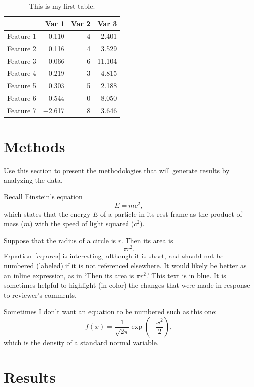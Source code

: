 \documentclass[12pt]{article}
\newcommand{\blue}{\color{blue}}
\begin{document}
\begin{table}[!t]
  \caption{This is my first table.}
	\label{tab:rv}
\centering
\begin{tabular}{lrrr}
  \toprule
& Var 1 & Var 2 & Var 3 \\ 
  \midrule
Feature 1 & $-$0.110 & 4 & 2.401 \\ 
Feature 2 &    0.116 & 4 & 3.529 \\ 
Feature 3 & $-$0.066 & 6 & 11.104 \\ 
Feature 4 &    0.219 & 3 & 4.815 \\ 
Feature 5 &    0.303 & 5 & 2.188 \\ 
Feature 6 &    0.544 & 0 & 8.050 \\ 
Feature 7 & $-$2.617 & 8 & 3.646 \\ 
  \bottomrule
\end{tabular}
\end{table}


\section{Methods}
\label{sec:meth}

Use this section to present the methodologies that will generate results by
analyzing the data. 

Recall Einstein's equation
\begin{equation}
  \label{eq:mc2}
  E = m c^2,
\end{equation}
which states that the energy $E$ of a particle in its rest frame as the product
of mass ($m$) with the speed of light squared ($c^2$).

Suppose that the radius of a circle is $r$. Then its area is
\begin{equation}
  \label{eq:area}
  \pi r^2.
\end{equation}
%
Equation~\eqref{eq:area} is interesting, although it is short, and should not
be numbered (labeled) if it is not referenced elsewhere. It would likely be 
better as an inline expression, as in `Then its area is $\pi r^2$.' {\blue This 
text is in blue. It is sometimes helpful to highlight (in color) the changes 
that were made in response to reviewer's comments.}

Sometimes I don't want an equation to be numbered such as this one:
\[
  f(x) = \frac{1}{\sqrt{2\pi}} \exp\left( - \frac{x^2}{2} \right),
\]
which is the density of a standard normal variable.


\section{Results}
\label{sec:resu}
\end{document}
